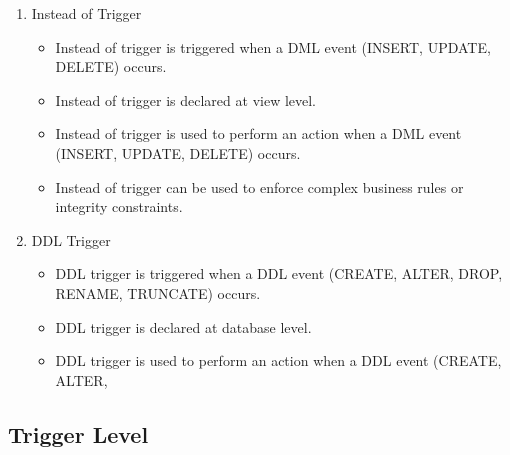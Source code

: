 \documentclass[11pt]{article}
\begin{document}
\begin{enumerate}
    \item Instead of Trigger
          \begin{itemize}
              \item Instead of trigger is triggered when a DML event (INSERT, UPDATE, DELETE) occurs.
              \item Instead of trigger is declared at view level.
              \item Instead of trigger is used to perform an action when a DML event (INSERT, UPDATE, DELETE) occurs.
              \item Instead of trigger can be used to enforce complex business rules or integrity constraints.
          \end{itemize}

    \item DDL Trigger
          \begin{itemize}
              \item DDL trigger is triggered when a DDL event (CREATE, ALTER, DROP, RENAME, TRUNCATE) occurs.
              \item DDL trigger is declared at database level.
              \item DDL trigger is used to perform an action when a DDL event (CREATE, ALTER,
    \end{itemize}
\end{enumerate}

\subsection{Trigger Level}
\end{document}
